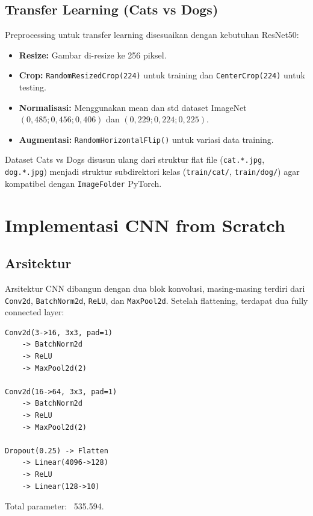 \documentclass[conference]{IEEEtran}
\begin{document}
\subsection{Transfer Learning (Cats vs Dogs)}
Preprocessing untuk transfer learning disesuaikan dengan kebutuhan ResNet50:
\begin{itemize}
	\item \textbf{Resize:} Gambar di-resize ke 256 piksel.
	\item \textbf{Crop:} \texttt{RandomResizedCrop(224)} untuk training dan \texttt{CenterCrop(224)} untuk testing.
	\item \textbf{Normalisasi:} Menggunakan mean dan std dataset ImageNet $(0,485; 0,456; 0,406)$ dan $(0,229; 0,224; 0,225)$.
	\item \textbf{Augmentasi:} \texttt{RandomHorizontalFlip()} untuk variasi data training.
\end{itemize}

Dataset Cats vs Dogs disusun ulang dari struktur flat file (\texttt{cat.*.jpg}, \texttt{dog.*.jpg}) menjadi struktur subdirektori kelas (\texttt{train/cat/}, \texttt{train/dog/}) agar kompatibel dengan \texttt{ImageFolder} PyTorch.

\section{Implementasi CNN from Scratch}
\subsection{Arsitektur}
Arsitektur CNN dibangun dengan dua blok konvolusi, masing-masing terdiri dari \texttt{Conv2d}, \texttt{BatchNorm2d}, \texttt{ReLU}, dan \texttt{MaxPool2d}. Setelah flattening, terdapat dua fully connected layer:

\begin{verbatim}
Conv2d(3->16, 3x3, pad=1)
    -> BatchNorm2d
    -> ReLU
    -> MaxPool2d(2)

Conv2d(16->64, 3x3, pad=1)
    -> BatchNorm2d
    -> ReLU
    -> MaxPool2d(2)

Dropout(0.25) -> Flatten
    -> Linear(4096->128)
    -> ReLU
    -> Linear(128->10)
\end{verbatim}

Total parameter: ~535.594.
\end{document}
